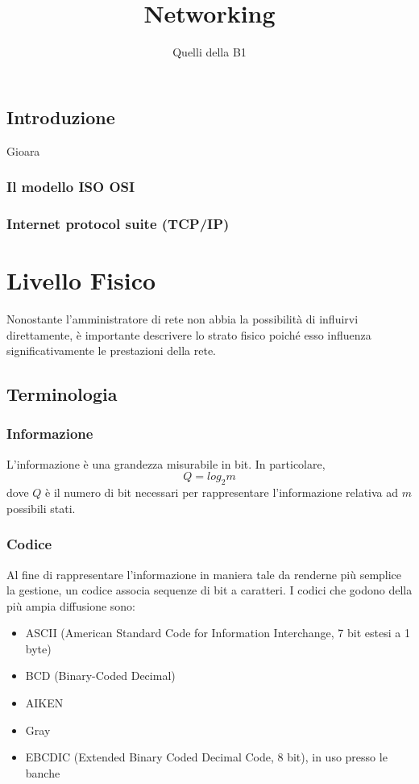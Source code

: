 \documentclass[a4paper,11pt]{paper}
\author{Quelli della B1}
\title{Networking}
\begin{document}
\maketitle
\newpage
\tableofcontents
\newpage

\subsection{Introduzione}
Gioara
\subsubsection{Il modello ISO OSI}
\subsubsection{Internet protocol suite (TCP/IP)}

\newpage

\section{Livello Fisico}
Nonostante l'amministratore di rete non abbia la possibilità di influirvi direttamente, è importante descrivere lo strato fisico poiché esso influenza significativamente le prestazioni della rete.
\subsection{Terminologia}
\subsubsection{Informazione} 
L'informazione è una grandezza misurabile in bit. In particolare, \[Q=log_{2}m\] dove $Q$ è il numero di bit necessari per rappresentare l'informazione relativa ad $m$ possibili stati. 

\subsubsection{Codice}
Al fine di rappresentare l'informazione in maniera tale da renderne più semplice la gestione, un codice associa sequenze di bit a caratteri. I codici che godono della più ampia diffusione sono:
\begin{itemize}
\item ASCII (American Standard Code for Information Interchange, 7 bit estesi a 1 byte)
\item BCD (Binary-Coded Decimal)
\item AIKEN 
\item Gray
\item EBCDIC (Extended Binary Coded Decimal Code, 8 bit), in uso presso le banche
\end{itemize}
\end{document}
